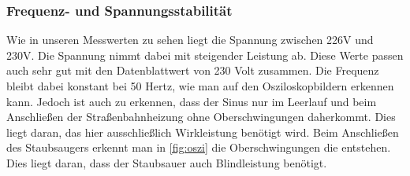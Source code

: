\subsubsection{Frequenz- und Spannungsstabilität}
Wie in unseren Messwerten zu sehen liegt die Spannung zwischen 226V und 230V. 
Die Spannung nimmt dabei mit steigender Leistung ab. 
Diese Werte passen auch sehr gut mit den Datenblattwert von 230 Volt zusammen. 
Die Frequenz bleibt dabei konstant bei 50 Hertz, wie man auf den Osziloskopbildern erkennen kann. 
Jedoch ist auch zu erkennen, dass der Sinus nur im Leerlauf und beim Anschließen der Straßenbahnheizung ohne Oberschwingungen daherkommt. 
Dies liegt daran, das hier ausschließlich Wirkleistung benötigt wird. 
Beim Anschließen des Staubsaugers erkennt man in \autoref{fig:oszi} die Oberschwingungen die entstehen. 
Dies liegt daran, dass der Staubsauer auch Blindleistung benötigt.
%
%

